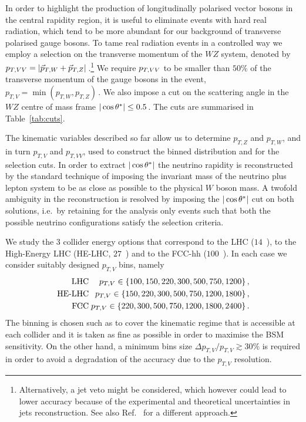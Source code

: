 In order to highlight the production of longitudinally polarised vector bosons in the central rapidity region, it is useful to eliminate events with hard real radiation, which tend to be more abundant for our background of transverse polarised gauge bosons. To tame real radiation events in a controlled way we employ a selection on the transverse momentum of the $WZ$ system, denoted by $p_{T,VV}=|{\vec{p}}_{T,W}+{\vec{p}}_{T,Z}|\,$.\footnote{Alternatively, a jet veto might be considered, which however could lead to lower accuracy because of the experimental and theoretical uncertainties in jets reconstruction.
See also Ref.~\cite{Campanario:2014lza} for a different approach.} We require $p_{T,VV}$ to be smaller than $50\%$ of the transverse momentum of the gauge bosons in the event, $p_{T,V} = \min(p_{T,W}, p_{T,Z})\,$. We also impose a cut on the scattering angle in the $WZ$ centre of mass frame
$|\cos \theta^{*}| \leq  0.5\,$. The cuts are summarised in Table~\ref{tab:cuts}.



The kinematic variables described so far allow us to determine $p_{T,Z}$ and $p_{T,W}$, and in turn $p_{T,V}$ and $p_{T,VV}$, used to construct the binned distribution and for the selection cuts. In order to extract $|\cos \theta^{*}|$ the neutrino rapidity is reconstructed by the standard technique of imposing the invariant mass of the neutrino plus lepton system to be as close as possible to the physical $W$ boson mass.
A twofold ambiguity in the reconstruction is resolved by imposing the $|\cos \theta^{*}|$ cut on both solutions, i.e.~by retaining for the analysis only events such that both the possible neutrino configurations satisfy the selection criteria.

We study the $3$ collider energy options that correspond to the LHC ($14$~\UTeV), to the High-Energy LHC (HE-LHC, $27$~\UTeV) and to the FCC-hh ($100$~\UTeV). In each case we consider suitably designed $p_{T,V}$ bins, namely 
\begin{eqnarray}\label{finalbins}
{\textrm{LHC\hspace{-10pt}}}&{\textrm{:}}& p_{T,V}\in\{100,150,220,300,500,750,1200 \}\,,\\
{\textrm{HE-LHC\hspace{-10pt}}}&{\textrm{:}}& p_{T,V}\in\{150,220,300,500,750,1200, 1800 \}\,,\nonumber\\
{\textrm{FCC\hspace{-10pt}}}&{\textrm{:}}& p_{T,V}\in\{220,300,500,750,1200, 1800, 2400 \}\,.\nonumber
\end{eqnarray}
The binning is chosen such as to cover the kinematic regime that is accessible at each collider and it is taken as fine as possible in order to maximise the BSM sensitivity. On the other hand, a minimum bins size $\Delta p_{T,V}/ p_{T,V}\gtrsim30\%$ is required in order to avoid a degradation of the accuracy due to the $p_{T,V}$ resolution.



